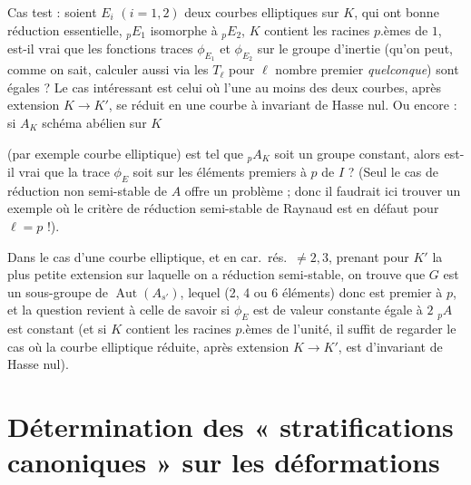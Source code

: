 \documentclass[11pt,a4paper]{article}
\begin{document}
Cas test : soient $E_i$ $(i = 1, 2)$ deux courbes elliptiques sur $K$, qui
ont bonne réduction essentielle, ${}_{p}E_1$ isomorphe à ${}_{p}E_2$, $K$
contient les racines $p$.èmes de $1$, est-il vrai que les fonctions traces
$\phi_{E_1}$ et $\phi_{E_2}$ sur le groupe d'inertie (qu'on peut, comme on
sait, calculer aussi via les $T_\ell$ pour $\ell$ nombre premier
\emph{quelconque}) sont égales  ?
Le cas intéressant est celui où l'une au moins des deux courbes, après
extension $K \to K'$, se réduit en une courbe à invariant de Hasse nul.
Ou encore : si $A_K$ schéma abélien sur $K$


(par exemple courbe elliptique) est tel que ${}_{p}A_K$ soit un groupe
constant, alors est-il vrai que la trace $\phi_E$ soit  sur les  éléments premiers à $p$ de $I$ ? (Seul le
cas de réduction non semi-stable de $A$ offre un problème ; donc il
faudrait ici trouver un exemple où le critère de réduction semi-stable de
Raynaud est en défaut pour $\ell = p$ !).

Dans le cas d'une courbe elliptique, et en car.\ rés.\ $\neq 2, 3$, prenant
pour $K'$ la plus petite extension sur laquelle on a réduction
semi-stable, on trouve que $G$ est un sous-groupe de $\operatorname{Aut}(A_{s'})$,
lequel   (2, 4 ou 6 éléments) donc est premier à
$p$, et la question revient à celle de savoir si $\phi_E$ est de valeur
constante égale à $2$    ${}_{p}A$
est constant (et si $K$ contient les racines $p$.èmes de l'unité, il suffit
de regarder le cas où la courbe elliptique réduite, après extension $K \to
K'$, est d'invariant de Hasse nul).

\section*{Détermination des « stratifications canoniques » sur les déformations}
\end{document}
